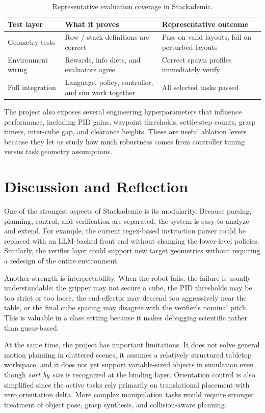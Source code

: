 \documentclass[10pt,letterpaper,twocolumn]{article}
\begin{document}
\begin{table}[H]
\centering
\caption{Representative evaluation coverage in Stackademic.}
\begin{tabular}{p{} p{} p{}}
\toprule
Test layer & What it proves & Representative outcome \\
\midrule
Geometry tests & Row / stack definitions are correct & Pass on valid layouts, fail on perturbed layouts \\
Environment wiring & Rewards, info dicts, and evaluators agree & Correct spawn profiles immediately verify \\
Full integration & Language, policy, controller, and sim work together & All selected tasks passed \\
\bottomrule
\end{tabular}
\end{table}

The project also exposes several engineering hyperparameters that influence performance, including PID gains, waypoint thresholds, settle-step counts, grasp timers, inter-cube gap, and clearance heights. These are useful ablation levers because they let us study how much robustness comes from controller tuning versus task geometry assumptions.

\section{Discussion and Reflection}
One of the strongest aspects of Stackademic is its modularity. Because parsing, planning, control, and verification are separated, the system is easy to analyze and extend. For example, the current regex-based instruction parser could be replaced with an LLM-backed front end without changing the lower-level policies. Similarly, the verifier layer could support new target geometries without requiring a redesign of the entire environment.

Another strength is interpretability. When the robot fails, the failure is usually understandable: the gripper may not secure a cube, the PID thresholds may be too strict or too loose, the end-effector may descend too aggressively near the table, or the final cube spacing may disagree with the verifier's nominal pitch. This is valuable in a class setting because it makes debugging scientific rather than guess-based.

At the same time, the project has important limitations. It does not solve general motion planning in cluttered scenes, it assumes a relatively structured tabletop workspace, and it does not yet support variable-sized objects in simulation even though \textit{sort by size} is recognized at the binding layer. Orientation control is also simplified since the active tasks rely primarily on translational placement with zero orientation delta. More complex manipulation tasks would require stronger treatment of object pose, grasp synthesis, and collision-aware planning.
\end{document}
